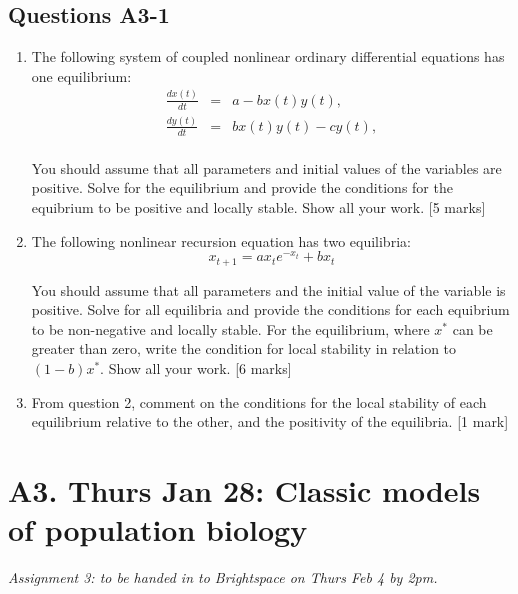 \documentclass[]{book}
\begin{document}
\section{Questions A3-1}\label{questions-a3-1}

\begin{enumerate}
\def\labelenumi{\arabic{enumi}.}
\item
  The following system of coupled nonlinear ordinary differential
  equations has one equilibrium:\\

  \begin{eqnarray}
  \frac{dx(t)}{dt} & = & a - bx(t)y(t),\\
  \frac{dy(t)}{dt} & = & bx(t)y(t) - cy(t),\\
  \end{eqnarray}

  You should assume that all parameters and initial values of the
  variables are positive. Solve for the equilibrium and provide the
  conditions for the equibrium to be positive and locally stable. Show
  all your work. {[}5 marks{]}\\
\item
  The following nonlinear recursion equation has two equilibria:\\

  \begin{equation}
  x_{t+1} = a x_t e^{-x_t}+bx_t
  \end{equation}

  You should assume that all parameters and the initial value of the
  variable is positive. Solve for all equilibria and provide the
  conditions for each equibrium to be non-negative and locally stable.
  For the equilibrium, where \(x^*\) can be greater than zero, write the
  condition for local stability in relation to \((1-b)x^*\). Show all
  your work. {[}6 marks{]}
\item
  From question 2, comment on the conditions for the local stability of
  each equilibrium relative to the other, and the positivity of the
  equilibria. {[}1 mark{]}
\end{enumerate}

\chapter{A3. Thurs Jan 28: Classic models of population
biology}\label{a3.-thurs-jan-28-classic-models-of-population-biology}

\emph{Assignment 3: to be handed in to Brightspace on Thurs Feb 4 by
2pm.}
\end{document}
